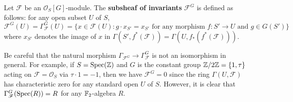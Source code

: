 \begin{remark}\label{scheme module over group invariant subshaef def}
Let $\mathscr{F}$ be an $\mathscr{O}_S[G]$-module. The \textbf{subsheaf of invariants} $\mathscr{F}^G$ is defined as follows: for any open subset $U$ of $S$,
\[\mathscr{F}^G(U)=\Gamma_\mathscr{F}^G(U)=\{x\in\mathscr{F}(U):\text{$g\cdot x_{S'}=x_{S'}$ for any morphism $f:S'\to U$ and $g\in G(S')$}\}\]
where $x_{S'}$ denotes the image of $x$ in $\Gamma(S',f^*(\mathscr{F}))=\Gamma(U,f_*(f^*(\mathscr{F})))$.\par
Be careful that the natural morphism $\Gamma_{\mathscr{F}^G}\to\Gamma_\mathscr{F}^G$ is not an isomorphism in general. For example, if $S=\mathrm{Spec}(\mathbb{Z})$ and $G$ is the constant group $\mathbb{Z}/2\mathbb{Z}=\{1,\tau\}$ acting on $\mathscr{F}=\mathscr{O}_S$ via $\tau\cdot 1=-1$, then we have $\mathscr{F}^G=0$ since the ring $\Gamma(U,\mathscr{F})$ has characteristic zero for any standard open $U$ of $S$. However, it is clear that $\Gamma_\mathscr{F}^G(\mathrm{Spec}(R))=R$ for any $\mathbb{F}_2$-algebra $R$.
\end{remark}

